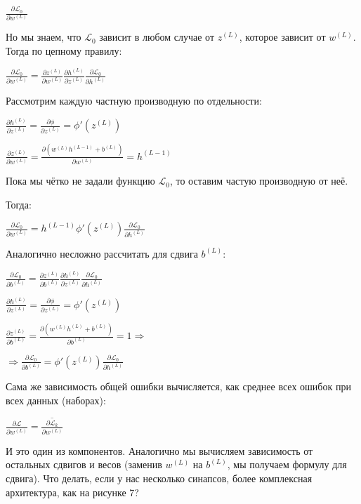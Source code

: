 \documentclass[12pt]{extarticle}
\begin{document}
	\centerline{$\frac{\partial \mathcal{L}_0}{\partial w^{(L)}}$}
	
	Но мы знаем, что $\mathcal{L}_0$ зависит в любом случае от $z^{(L)}$, которое зависит от $w^{(L)}$. Тогда по цепному правилу:
	
	\centerline{$\frac{\partial \mathcal{L}_0}{\partial w^{(L)}} = \frac{\partial z^{(L)}}{\partial w^{(L)}}\frac{\partial h^{(L)}}{\partial z^{(L)}}\frac{\partial \mathcal{L}_0 }{\partial h^{(L)}}$}
	
	Рассмотрим каждую частную производную по отдельности:
	
	\centerline{$\frac{\partial h^{(L)}}{\partial z^{(L)}} = \frac{\partial \phi}{\partial z^{(L)}} = \phi'(z^{(L)})$}
	
	\centerline{$\frac{\partial z^{(L)}}{\partial w^{(L)}} = \frac{\partial (w^{(L)}h^{(L-1)}+b^{(L)})}{\partial w^{(L)}} = h^{(L-1)}$}
	
	Пока мы чётко не задали функцию $\mathcal{L}_0$, то оставим частую производную от неё.
	
	Тогда:
	
	\centerline{$\frac{\partial \mathcal{L}_0}{\partial w^{(L)}} = h^{(L-1)}\phi'(z^{(L)})\frac{\partial \mathcal{L}_0 }{\partial h^{(L)}}$}
	
	Аналогично несложно рассчитать для сдвига $b^{(L)}$:
	
	\centerline{$\frac{\partial \mathcal{L}_0}{\partial b^{(L)}} = \frac{\partial z^{(L)}}{\partial b^{(L)}}\frac{\partial h^{(L)}}{\partial z^{(L)}}\frac{\partial \mathcal{L}_0 }{\partial h^{(L)}}$}
	
	\centerline{$\frac{\partial h^{(L)}}{\partial z^{(L)}} = \frac{\partial \phi}{\partial z^{(L)}} = \phi'(z^{(L)})$}
	
	\centerline{$\frac{\partial z^{(L)}}{\partial b^{(L)}}= \frac{\partial(w^{(L)}h^{(L)}+b^{(L)})}{\partial b^{(L)}} = 1 \Rightarrow$}

	\centerline{$\Rightarrow \frac{\partial \mathcal{L}_0}{\partial b^{(L)}} = \phi'(z^{(L)})\frac{\partial \mathcal{L}_0 }{\partial h^{(L)}}$}
	
	Сама же зависимость общей ошибки вычисляется, как среднее всех ошибок при всех данных (наборах):	

    \centerline{$\frac{\partial \mathcal{L}}{\partial w^{(L)}} = \overline{\frac{\partial  \mathcal{L}_k}{\partial w^{(L)}}}$}
	
	И это один из компонентов. Аналогично мы вычисляем зависимость от остальных сдвигов и весов (заменив $w^{(L)}$ на $b^{(L)}$, мы получаем  формулу для сдвига).
	\newpage
	Что делать, если у нас несколько синапсов, более комплексная архитектура, как на рисунке 7?
	
\end{document}
